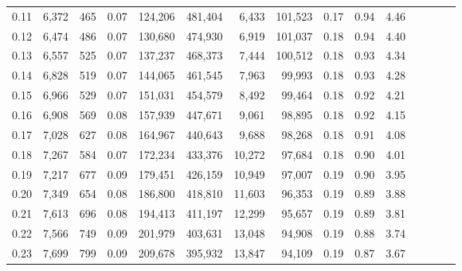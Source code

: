 \begin{tabular}{rrrcrrrrrrrrrrr}
0.11 &   6,372 &     465 &                                       0.07 &  124,206 &  481,404 &    6,433 &  101,523 &  0.17 &  0.94 &                         4.46 \\
0.12 &   6,474 &     486 &                                       0.07 &  130,680 &  474,930 &    6,919 &  101,037 &  0.18 &  0.94 &                         4.40 \\
0.13 &   6,557 &     525 &                                       0.07 &  137,237 &  468,373 &    7,444 &  100,512 &  0.18 &  0.93 &                         4.34 \\
0.14 &   6,828 &     519 &                                       0.07 &  144,065 &  461,545 &    7,963 &   99,993 &  0.18 &  0.93 &                         4.28 \\
0.15 &   6,966 &     529 &                                       0.07 &  151,031 &  454,579 &    8,492 &   99,464 &  0.18 &  0.92 &                         4.21 \\
0.16 &   6,908 &     569 &                                       0.08 &  157,939 &  447,671 &    9,061 &   98,895 &  0.18 &  0.92 &                         4.15 \\
0.17 &   7,028 &     627 &                                       0.08 &  164,967 &  440,643 &    9,688 &   98,268 &  0.18 &  0.91 &                         4.08 \\
0.18 &   7,267 &     584 &                                       0.07 &  172,234 &  433,376 &   10,272 &   97,684 &  0.18 &  0.90 &                         4.01 \\
0.19 &   7,217 &     677 &                                       0.09 &  179,451 &  426,159 &   10,949 &   97,007 &  0.19 &  0.90 &                         3.95 \\
0.20 &   7,349 &     654 &                                       0.08 &  186,800 &  418,810 &   11,603 &   96,353 &  0.19 &  0.89 &                         3.88 \\
0.21 &   7,613 &     696 &                                       0.08 &  194,413 &  411,197 &   12,299 &   95,657 &  0.19 &  0.89 &                         3.81 \\
0.22 &   7,566 &     749 &                                       0.09 &  201,979 &  403,631 &   13,048 &   94,908 &  0.19 &  0.88 &                         3.74 \\
0.23 &   7,699 &     799 &                                       0.09 &  209,678 &  395,932 &   13,847 &   94,109 &  0.19 &  0.87 &                         3.67 \\

\end{tabular}
